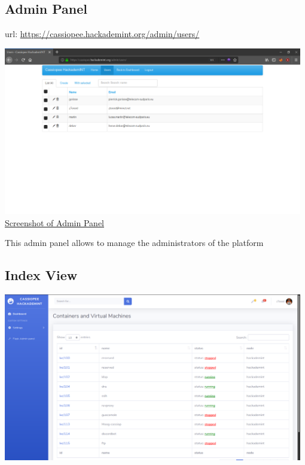 \subsection{Admin Panel}
url: \url{https://cassiopee.hackademint.org/admin/users/}
\\
\begin{center}
\includegraphics[width=0.98\textwidth]{images/flask-application-0.png}
\\
\underline{Screenshot of Admin Panel}
\end{center}

This admin panel allows to manage the administrators of the platform


\subsection{Index View}
\vspace{1cm}
\begin{center}
\includegraphics[width=0.98\textwidth]{images/flask-application-1.png}
\end{center}

\pagebreak

